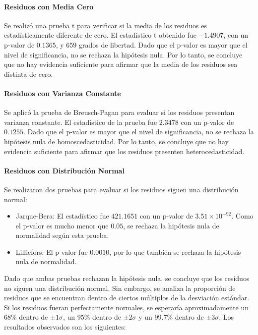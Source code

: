 \documentclass[12pt,letterpaper]{article}   %
\begin{document}
\paragraph{Residuos con Media Cero}
Se realizó una prueba t para verificar si la media de los residuos es estadísticamente diferente de cero. El estadístico t obtenido fue $-1.4907$, con un p-valor de $0.1365$, y $659$ grados de libertad. Dado que el p-valor es mayor que el nivel de significancia, no se rechaza la hipótesis nula. Por lo tanto, se concluye que no hay evidencia suficiente para afirmar que la media de los residuos sea distinta de cero.


\paragraph{Residuos con Varianza Constante}
Se aplicó la prueba de Breusch-Pagan para evaluar si los residuos presentan varianza constante. El estadístico de la prueba fue $2.3478$ con un p-valor de $0.1255$. Dado que el p-valor es mayor que el nivel de significancia, no se rechaza la hipótesis nula de homoscedasticidad. Por lo tanto, se concluye que no hay evidencia suficiente para afirmar que los residuos presenten heterocedasticidad.

\paragraph{Residuos con Distribución Normal}
Se realizaron dos pruebas para evaluar si los residuos siguen una distribución normal:

\begin{itemize}
    \item Jarque-Bera: El estadístico fue $421.1651$ con un p-valor de $3.51 \times 10^{-92}$. Como el p-valor es mucho menor que $0.05$, se rechaza la hipótesis nula de normalidad según esta prueba.
    \item Lilliefors: El p-valor fue $0.0010$, por lo que también se rechaza la hipótesis nula de normalidad.
\end{itemize}

Dado que ambas pruebas rechazan la hipótesis nula, se concluye que los residuos no siguen una distribución normal. Sin embargo, se analiza la proporción de residuos que se encuentran dentro de ciertos múltiplos de la desviación estándar. Si los residuos fueran perfectamente normales, se esperaría aproximadamente un 68\% dentro de $\pm1\sigma$, un 95\% dentro de $\pm2\sigma$ y un 99.7\% dentro de $\pm3\sigma$. Los resultados observados son los siguientes:
\end{document}
